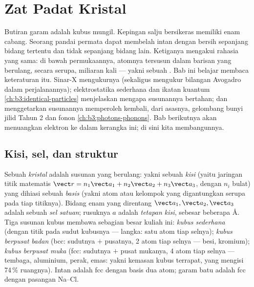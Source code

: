 \chapter{Zat Padat Kristal}\label{ch:b3:crystalline-solids}


Butiran garam adalah kubus mungil. Kepingan salju bersikeras memiliki
enam cabang. Seorang pandai permata dapat membelah intan dengan bersih
sepanjang bidang tertentu dan tidak sepanjang bidang lain. Ketiganya
mengakui rahasia yang sama: di bawah permukaannya, atomnya tersusun
dalam barisan yang berulang, secara serupa, miliaran kali --- yakni
sebuah \emph{}. Bab ini belajar membaca keteraturan itu. Sinar-X
mengukurnya (sekaligus mengukur bilangan Avogadro dalam perjalanannya);
elektrostatika sederhana dan ikatan kuantum
\cref{ch:b3:identical-particles} menjelaskan mengapa susunannya
bertahan; dan menggetarkan susunannya memperoleh kembali, dari asasnya,
gelombang bunyi jilid Tahun 2 dan fonon
\cref{ch:b3:photons-phonons}. Bab berikutnya akan menuangkan elektron
ke dalam kerangka ini; di sini kita membangunnya.

\section{Kisi, sel, dan struktur}

\begin{definition}\label{def:b3:crystalline-solids:lattice}
Sebuah \emph{kristal} adalah susunan yang berulang: yakni sebuah
\emph{kisi} (yaitu jaringan titik matematis $\vect r = n_1\vect a_1 + n_2\vect a_2
+ n_3\vect a_3$, dengan $n_i$ bulat) yang dihiasi sebuah \emph{basis}
(yakni atom atau kelompok yang digantungkan serupa pada tiap titiknya).
Bidang enam yang direntang
$\vect a_1, \vect a_2, \vect a_3$ adalah sebuah \emph{sel satuan};
rusuknya $a$ adalah \emph{tetapan kisi}, sebesar beberapa
\unit{\angstrom}. Tiga susunan kubus membawa sebagian besar kuliah ini:
\emph{kubus sederhana} (dengan titik pada sudut kubusnya --- langka: satu atom tiap
selnya); \emph{kubus berpusat badan} (bcc: sudutnya $+$ pusatnya, 2 atom
tiap selnya --- besi, kromium); \emph{kubus berpusat muka} (fcc:
sudutnya $+$ pusat mukanya, 4 atom tiap selnya --- tembaga, aluminium,
perak, emas: yakni kemasan kubus terrapat, yang mengisi 74\,\% ruangnya).
Intan adalah fcc dengan basis dua atom; garam batu adalah fcc dengan
pasangan Na--Cl.
\end{definition}

